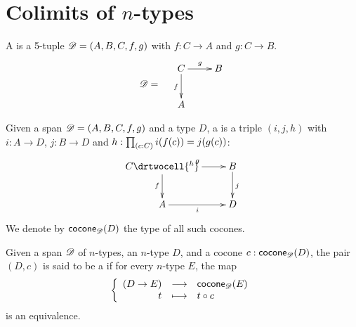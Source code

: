\documentclass[hott-all.tex]{subfiles}
\begin{document}
\section{Colimits of \texorpdfstring{$n$}{n}-types}
% 
% 
% 
\begin{defn}
  A  %
  is a 5-tuple $\mathscr{D}=(A,B,C,f,g)$ with %
  $f:C\to{}A$ and $g:C\to{}B$.
  \[\Ddiag=\quad\vcenter{\xymatrix{C \ar^g[r] \ar_f[d] & B \\ A & }}\]
\end{defn}
% 
\begin{defn}
  Given a span $\mathscr{D}=(A,B,C,f,g)$ and a type $D$, a %
   is a triple $(i, j, h)$
  with $i:A\to{}D$, $j:B\to{}D$ and $h : \prd{c:C}i(f(c))=j(g(c))$:
  \[\uppercurveobject{{ }}\lowercurveobject{{ }}\twocellhead{{ }}
  \xymatrix{C \ar^g[r] \ar_f[d] \drtwocell{^h} & B \ar^j[d] \\ A \ar_i[r] & D
  }\]
  We denote by $\mathsf{cocone}_{\mathscr{D}}(D)$ the type of all such cocones.
\end{defn}
% 
% 
\begin{defn}
  Given a span $\mathscr{D}$ of $n$-types, an $n$-type $D$, and a cocone
  $c:\mathsf{cocone}_{\mathscr{D}}(D)$, the pair $(D,c)$ is said to be a 
  if for every $n$-type $E$, the map
  \[\left\{\begin{array}{rcl}(D\to{}E) & \longrightarrow & \mathsf{cocone}_{\mathscr{D}}(E) \\ t & \longmapsto & t\circ c \end{array}\right.\]
  is an equivalence.
\end{defn}
\end{document}
